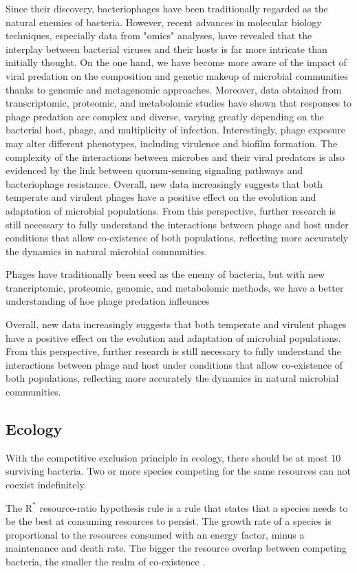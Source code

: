 Since their discovery, bacteriophages have been traditionally regarded as the natural enemies of bacteria. However, recent advances in molecular biology techniques, especially data from "omics" analyses, have revealed that the interplay between bacterial viruses and their hosts is far more intricate than initially thought. On the one hand, we have become more aware of the impact of viral predation on the composition and genetic makeup of microbial communities thanks to genomic and metagenomic approaches. Moreover, data obtained from transcriptomic, proteomic, and metabolomic studies have shown that responses to phage predation are complex and diverse, varying greatly depending on the bacterial host, phage, and multiplicity of infection. Interestingly, phage exposure may alter different phenotypes, including virulence and biofilm formation. The complexity of the interactions between microbes and their viral predators is also evidenced by the link between quorum-sensing signaling pathways and bacteriophage resistance. Overall, new data increasingly suggests that both temperate and virulent phages have a positive effect on the evolution and adaptation of microbial populations. From this perspective, further research is still necessary to fully understand the interactions between phage and host under conditions that allow co-existence of both populations, reflecting more accurately the dynamics in natural microbial communities.

Phages have traditionally been seed as the enemy of bacteria, but with new trancriptomic, proteomic, genomic, and metabolomic methods, we have a better understanding of hoe phage predation infleunces 

Overall, new data increasingly suggests that both temperate and virulent phages have a positive effect on the evolution and adaptation of microbial populations. From this perspective, further research is still necessary to fully understand the interactions between phage and host under conditions that allow co-existence of both populations, reflecting more accurately the dynamics in natural microbial communities. 

\subsection{Ecology}
With the competitive exclusion principle in ecology, there should be at most 10 surviving bacteria. 
Two or more species competing for the same resources can not coexist indefinitely. 

The $\text{R}^{*}$ resource-ratio hypothesis rule is a rule that states that a species needs to be the best at consuming resources to persist. 
The growth rate of a species is proportional to the resources consumed with an energy factor, minus a maintenance and death rate. 
The bigger the resource overlap between competing bacteria, the smaller the realm of co-existence \cite{vandenbergEcologicalModellingApproaches2022}. 

